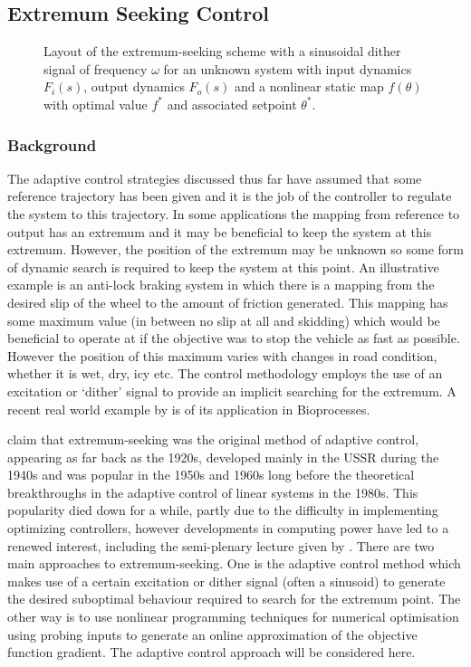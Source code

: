 \subsection{Extremum Seeking Control}

\begin{figure}
\centering

\caption{Layout of the extremum-seeking scheme with a sinusoidal dither signal of frequency $\omega$ for an unknown system with input dynamics $F_i(s)$, output dynamics $F_o(s)$ and a nonlinear static map $f(\theta)$ with optimal value $f^*$ and associated setpoint $\theta^*$.}
\label{figs:statES}
\end{figure}

\subsubsection{Background}

The adaptive control strategies discussed thus far have assumed that some reference trajectory has been given and it is the job of the controller to regulate the system to this trajectory. In some applications the mapping from reference to output has an extremum and it may be beneficial to keep the system at this extremum. However, the position of the extremum may be unknown so some form of dynamic search is required to keep the system at this point. An illustrative example is an anti-lock braking system in which there is a mapping from the desired slip of the wheel to the amount of friction generated. This mapping has some maximum value (in between no slip at all and skidding) which would be beneficial to operate at if the objective was to stop the vehicle as fast as possible. However the position of this maximum varies with changes in road condition, whether it is wet, dry, icy etc. The control methodology employs the use of an excitation or `dither' signal to provide an implicit searching for the extremum. A recent real world example by \cite{BNTM09} is of its application in Bioprocesses. 

\cite{ArKr03} claim that extremum-seeking was the original method of adaptive control, appearing as far back as the 1920s, developed mainly in the USSR during the 1940s and was popular in the 1950s and 1960s long before the theoretical breakthroughs in the adaptive control of linear systems in the 1980s. This popularity died down for a while, partly due to the difficulty in implementing optimizing controllers, however developments in computing power have led to a renewed interest, including the semi-plenary lecture given by \cite{Nes09}. There are two main approaches to extremum-seeking. One is the adaptive control method which makes use of a certain excitation or dither signal (often a sinusoid) to generate the desired suboptimal behaviour required to search for the extremum point. The other way is to use nonlinear programming techniques for numerical optimisation using probing inputs to generate an online approximation of the objective function gradient. The adaptive control approach will be considered here.

